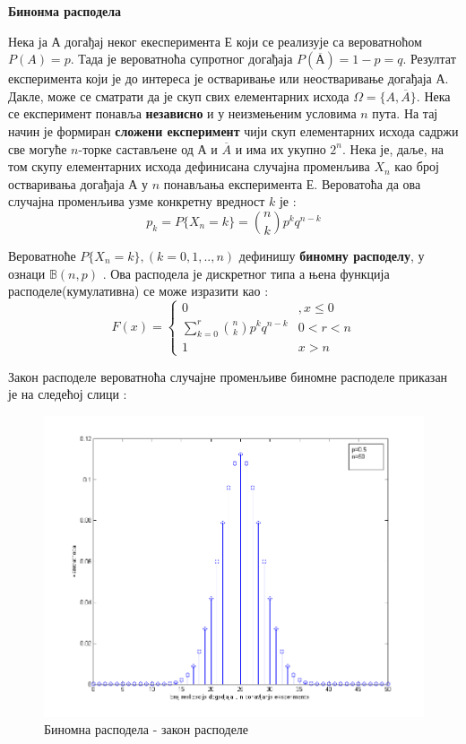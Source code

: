 \textbf{Бинонма расподела}

Нека ја А догађај неког екесперимента Е који се реализује са вероватноћом  $P(A) = p$. Тада је вероватноћа супротног догађаја $P(\overline{А}) = 1-p = q$. 
Резултат експеримента који је до интереса је остваривање или неостваривање догађаја А. Дакле, може се сматрати да је скуп свих елементарних исхода $\Omega = \lbrace A, \overline{A} \rbrace$. Нека се експеримент понавља \textbf{независно} и у неизмењеним условима $n$ пута. На тај начин је формиран \textbf{сложени експеримент} чији  скуп елементарних исхода садржи све могуће $n$-торке састављене од $А$ и $\overline{A}$ и има их укупно $2^n$. Нека је, даље, на том скупу елементарних исхода дефинисана случајна променљива $X_n$ као  број остваривања догађаја А у $n$ понављања експеримента Е. Вероватоћа да ова случајна променљива узме конкретну вредност $k$ је :
$$
p_k = P \lbrace X_n = k \rbrace ={ n \choose k} p^kq^{n-k}
$$

Вероватноће $P \lbrace X_n = k \rbrace ,(k=0,1,..,n)$ дефинишу\textbf{ биномну расподелу}, у ознаци $\mathbb{B}(n,p)$ . Ова расподела је дискретног типа а њена функција расподеле(кумулативна) се може изразити као :
$$
F(x)=\left\lbrace
\begin{array}{cc}
0 & , x \leq 0 \\
\sum_{k=0}^{r} {n \choose k} p^kq^{n-k} & 0 < r < n \\
1 & x > n
\end{array}
\right.
$$

Закон расподеле вероватноћа случајне променљиве биномне расподеле приказан је на следећој слици :


\begin{figure}[H]
    \centering
\captionsetup{justification=centering}
   \includegraphics[scale=0.5]{./Slike/slika28.png} 
	\caption{Биномна расподела - закон расподеле} 
	\label{fig:slika20}
\end{figure}

